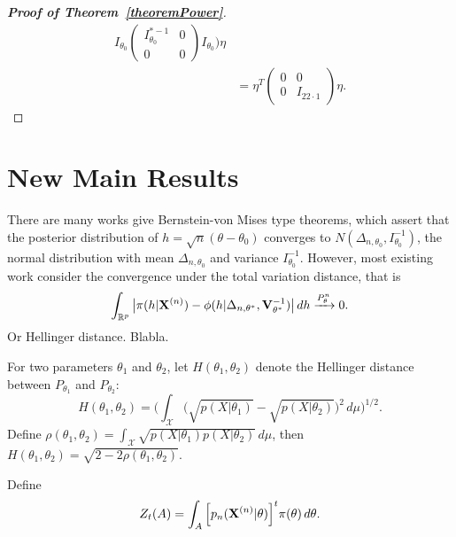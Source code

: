 \documentclass[3p]{elsarticle}
\theoremstyle{plain}
\theoremstyle{definition}
\theoremstyle{remark}
\begin{document}
\begin{proof}[\textbf{Proof of Theorem~\ref{theoremPower}}]
\begin{equation}
\begin{aligned}
        I_{\theta_0}
        \left(\begin{matrix} 
                I^{*-1}_{\theta_0}&0\\
                0&0
        \end{matrix}\right)
        I_{\theta_0}
    )\eta
    \\
    &=\eta^T
    \left(
        \begin{matrix}
            0&0\\
            0&I_{22\cdot 1}
        \end{matrix}
    \right)
    \eta.
    \end{aligned}
\end{equation}
\end{proof}

\section{New Main Results}







There are many works give Bernstein-von Mises type theorems, which assert that the posterior distribution of $h=\sqrt{n}(\theta-\theta_0)$ converges to $N(\Delta_{n,\theta_0},I_{\theta_0}^{-1})$, the normal distribution with mean $\Delta_{n,\theta_0}$ and variance $I_{\theta_0}^{-1}$.
However, most existing work consider the convergence under the total variation distance, that is
$$
\int_{\mathbb{R}^p}\big|\pi(h|\mathbf{X}^{(n)})-\phi(h|\Delta_{n,\theta^*},\mathbf{V}_{\theta^*}^{-1})\big| \, dh \xrightarrow{P_{\theta}^n} 0.
$$
Or Hellinger distance. Blabla.








For two parameters $\theta_1$ and $\theta_2$, let $H(\theta_1,\theta_2)$ denote the Hellinger distance between $P_{\theta_1}$ and $P_{\theta_2}$:
$$H(\theta_1,\theta_2)=\Big(\int_{\mathcal{X}}\big(\sqrt{p(X|\theta_1)}-\sqrt{p(X|\theta_2)}\big)^2 \, d \mu\Big)^{1/2}.$$
Define
$
\rho(\theta_1,\theta_2)=\int_{\mathcal{X}} \sqrt{p(X|\theta_1) p(X|\theta_2)} \, d \mu
$,
then
$H(\theta_1,\theta_2)=\sqrt{2-2\rho(\theta_1,\theta_2) }$.



Define
$$
Z_t (A)=\int_{A} \Big[ {p_n(\mathbf{X}^{(n)}|\theta)} \Big]^{t} \pi(\theta) \, d \theta.
$$
\end{document}

